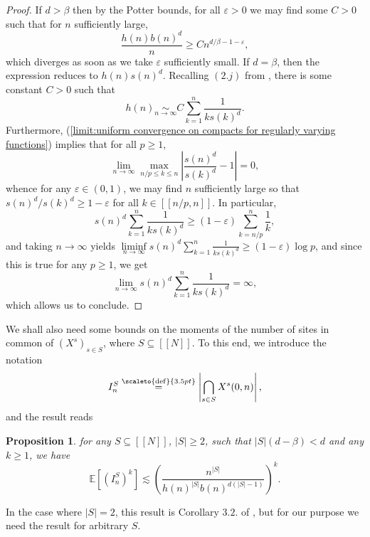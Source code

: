 \documentclass[12pt]{article}
\newcommand{\EE}{\mathbb E}
\newcommand{\1}{\mathds{1}}
\newcommand{\eqdef}{\stackrel{\scaleto{\mathrm{def}}{3.5pt}}{=}}
\newtheorem{proposition}{Proposition}
\numberwithin{equation}{section}
\begin{document}
\begin{proof}
    If $d>\beta$ then by the Potter bounds, for all $\varepsilon>0$ we may find some $C>0$ such that for $n$ sufficiently large, 
    \begin{equation*}
        \frac{h(n)b(n)^d}{n}\ge Cn^{d/\beta-1-\varepsilon},
    \end{equation*}
    which diverges as soon as we take $\varepsilon$ sufficiently small. If $d=\beta$, then the expression reduces to $h(n)s(n)^d$. Recalling $(2.j)$ from \cite{LeGallRosenRangeOfStableRandomWalks1991}, there is some constant $C>0$ such that 
    \begin{equation*}
        h(n)\underset{n\rightarrow\infty}\sim C\sum_{k=1}^n\frac{1}{ks(k)^d}.
    \end{equation*}
    Furthermore, (\ref{limit:uniform convergence on compacts for regularly varying functions}) implies that for all $p\ge1$, 
    \begin{equation*}
        \underset{n\rightarrow\infty}\lim\max_{n/p\le k\le n}\left|\frac{s(n)^d}{s(k)^d}-1\right|=0,
    \end{equation*}
    whence for any $\varepsilon\in(0,1)$, we may find $n$ sufficiently large so that $s(n)^d/s(k)^d\ge1-\varepsilon$ for all $k\in[\![n/p,n]\!]$. In particular,
    \begin{equation*}
        s(n)^d\sum_{k=1}^n\frac{1}{ks(k)^d}\ge(1-\varepsilon)\sum_{k=n/p}^n\frac1k,
    \end{equation*}
    and taking $n\rightarrow\infty$ yields $\underset{n\rightarrow\infty}\liminf s(n)^d\sum_{k=1}^n\frac{1}{ks(k)^d}\ge (1-\varepsilon)\log p$, and since this is true for any $p\ge1$, we get 
    \begin{equation*}
        \underset{n\rightarrow\infty}\lim s(n)^d\sum_{k=1}^n\frac{1}{ks(k)^d}=\infty,
    \end{equation*}
    which allows us to conclude.
\end{proof}

We shall also need some bounds on the moments of the number of sites in common of $(X^s)_{s\in S}$, where $S\subseteq[\![N]\!]$. To this end, we introduce the notation
    \begin{equation*}
        I_n^S\eqdef\left|\bigcap_{s\in S} X^s(0,n)\right|,
    \end{equation*}
    and the result reads
    \begin{proposition}
        \label{proposition:bounds on moments of intersections}
        for any $S\subseteq[\![N]\!]$, $|S|\ge2$, such that $|S|(d-\beta)<d$ and any $k\ge1$, we have 
        \begin{equation*}
        \EE\left[\left(I_n^S\right)^k\right]\lesssim\left(\frac{n^{|S|}}{h(n)^{|S|}b(n)^{d(|S|-1)}}\right)^k.
        \end{equation*}
    \end{proposition}
    In the case where $|S|=2$, this result is Corollary $3.2.$ of \cite{LeGallRosenRangeOfStableRandomWalks1991}, but for our purpose we need the result for arbitrary $S$.
\end{document}
